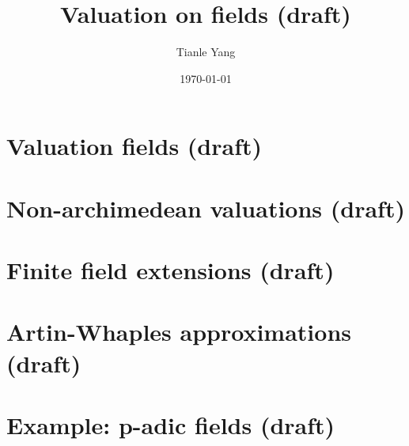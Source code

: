 \documentclass[sectionlevel=chapter]{noteformyself}
\title{Valuation on fields (draft)}
\author{Tianle Yang}
\date{\today}
\begin{document}
    \maketitle

    \tableofcontents

    \section{Valuation fields (draft)}
    
    \section{Non-archimedean valuations (draft)}
    
    \section{Finite field extensions (draft)}
    
    \section{Artin-Whaples approximations (draft)}
    
    \section{Example: p-adic fields (draft)}
    

    \printbibliography[heading=bibintoc, title={References}]
    
\end{document}
